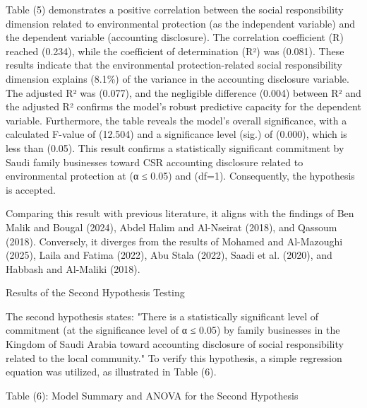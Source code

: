 \documentclass[10pt]{NSP1}
\begin{document}
Table (5) demonstrates a positive correlation between the social responsibility dimension related to environmental protection (as the independent variable) and the dependent variable (accounting disclosure). The correlation coefficient (R) reached (0.234), while the coefficient of determination (R²) was (0.081). These results indicate that the environmental protection-related social responsibility dimension explains (8.1\%) of the variance in the accounting disclosure variable. The adjusted R² was (0.077), and the negligible difference (0.004) between R² and the adjusted R² confirms the model’s robust predictive capacity for the dependent variable. Furthermore, the table reveals the model's overall significance, with a calculated F-value of (12.504) and a significance level (sig.) of (0.000), which is less than (0.05). This result confirms a statistically significant commitment by Saudi family businesses toward CSR accounting disclosure related to environmental protection at (α ≤ 0.05) and (df=1). Consequently, the hypothesis is accepted.

Comparing this result with previous literature, it aligns with the findings of Ben Malik and Bougal (2024), Abdel Halim and Al-Nseirat (2018), and Qassoum (2018). Conversely, it diverges from the results of Mohamed and Al-Mazoughi (2025), Laila and Fatima (2022), Abu Stala (2022), Saadi et al. (2020), and Habbash and Al-Maliki (2018).

Results of the Second Hypothesis Testing

The second hypothesis states: "There is a statistically significant level of commitment (at the significance level of α ≤ 0.05) by family businesses in the Kingdom of Saudi Arabia toward accounting disclosure of social responsibility related to the local community." To verify this hypothesis, a simple regression equation was utilized, as illustrated in Table (6).

Table (6): Model Summary and ANOVA for the Second Hypothesis

\begin{table}[htbp]
\centering
{}
\caption{}

\end{table}
\end{document}
